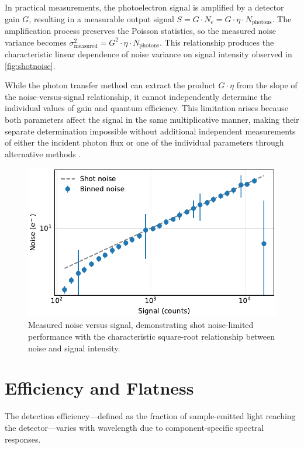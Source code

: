 \documentclass[
	parskip=half,
	a4paper,
]{scrarticle}
\begin{document}
In practical measurements, the photoelectron signal is amplified by a detector gain $G$, resulting in a measurable output signal $S = G \cdot N_e = G \cdot \eta \cdot N_{\text{photons}}$. The amplification process preserves the Poisson statistics, so the measured noise variance becomes $\sigma^2_{\text{measured}} = G^2 \cdot \eta \cdot N_{\text{photons}}$. This relationship produces the characteristic linear dependence of noise variance on signal intensity observed in \autoref{fig:shotnoise}.

While the photon transfer method can extract the product $G \cdot \eta$ from the slope of the noise-versus-signal relationship, it cannot independently determine the individual values of gain and quantum efficiency. This limitation arises because both parameters affect the signal in the same multiplicative manner, making their separate determination impossible without additional independent measurements of either the incident photon flux or one of the individual parameters through alternative methods \cite{european_machine_vision_association_standard_2010}.

\begin{figure}
    \centering
    \includegraphics{../analysis/figures/shot noise.pdf}
    \caption{Measured noise versus signal, demonstrating shot noise-limited performance with the characteristic square-root relationship between noise and signal intensity.}
    \label{fig:shotnoise}
\end{figure}

\section{Efficiency and Flatness}

The detection efficiency—defined as the fraction of sample-emitted light reaching the detector—varies with wavelength due to component-specific spectral responses.
\end{document}
